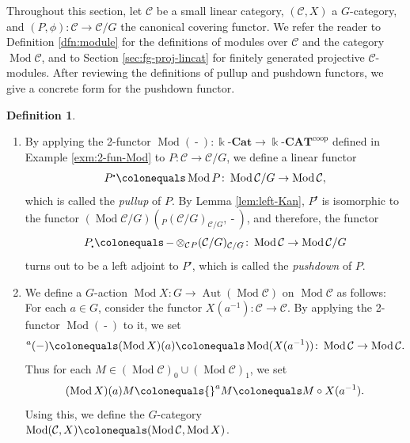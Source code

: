 \documentclass{surv-l}
\numberwithin{equation}{chapter}
\numberwithin{figure}{chapter}
\theoremstyle{plain}
\theoremstyle{definition}
\newtheorem{dfn}[thm]{Definition}
\theoremstyle{remark}
\newcommand{\kCAT}{\Bbbk\text{-}\mathbf{CAT}}
\newcommand{\kCat}{\Bbbk\text{-}\mathbf{Cat}}
\DeclareMathOperator{\Aut}{Aut}
\DeclareMathOperator{\Mod}{Mod}
\DeclareMathOperator{\blank}{-}
\begin{document}
Throughout this section, let ${\mathcal{C}}$ be a small linear category, $({\mathcal{C}}, X)$ a $G$-category,
and $(P, \phi) \colon {\mathcal{C}} \to {\mathcal{C}}/G$ the canonical covering functor.
We refer the reader to Definition \ref{dfn:module} for the definitions of modules over ${\mathcal{C}}$ and the category $\Mod {\mathcal{C}}$, and to Section \ref{sec:fg-proj-lincat} for finitely generated projective ${\mathcal{C}}$-modules.
After reviewing the definitions of pullup and pushdown functors,
we give a concrete form for the pushdown functor.

\begin{dfn}\leavevmode
\begin{enumerate}
\item
By applying the 2-functor $\Mod(\blank)\colon \kCat \to \kCAT^{\mathrm{coop}}$
defined in Example \ref{exm:2-fun-Mod} to
$P \colon {\mathcal{C}} \to {\mathcal{C}}/G$, we define a linear functor
\[
P^{\centerdot}\colonequals  \Mod P\colon \Mod {\mathcal{C}}/G \to \Mod {\mathcal{C}},
\]
which is called the \emph{pullup} of $P$.
By Lemma \ref{lem:left-Kan}, $P^{\centerdot}$ is isomorphic to the functor
$(\Mod {\mathcal{C}}/G)({}_P({\mathcal{C}}/G)_{{\mathcal{C}}/G}, \blank)$, and therefore, the functor
\[
P_{\centerdot}\colonequals \blank \otimes_{\mathcal{C}} {}_P({\mathcal{C}}/G)_{{\mathcal{C}}/G} \colon \Mod {\mathcal{C}} \to \Mod {\mathcal{C}}/G
\]
turns out to be a left adjoint to $P^{\centerdot}$, which is called the
\emph{pushdown} of $P$.

\item
We define a $G$-action $\Mod X \colon G \to \Aut(\Mod {\mathcal{C}})$ on $\Mod {\mathcal{C}}$ as follows:
For each $a \in G$, consider the functor $X(a^{-1}) \colon {\mathcal{C}} \to {\mathcal{C}}$.
By applying the 2-functor $\Mod(\blank)$ to it, we set
\[
{}^a(\blank)\colonequals  (\Mod X)(a)\colonequals  \Mod (X(a^{-1})) \colon \Mod {\mathcal{C}} \to \Mod {\mathcal{C}}.
\]
Thus for each $M \in (\Mod {\mathcal{C}})_0 \cup (\Mod {\mathcal{C}})_1$, we set
\[
(\Mod X)(a)M\colonequals {}^{a}M\colonequals  M \circ X(a^{-1}).
\]
Using this, we define the $G$-category $\Mod({\mathcal{C}}, X)\colonequals  (\Mod{\mathcal{C}}, \Mod X)$.
\end{enumerate}
\end{dfn}
\end{document}
